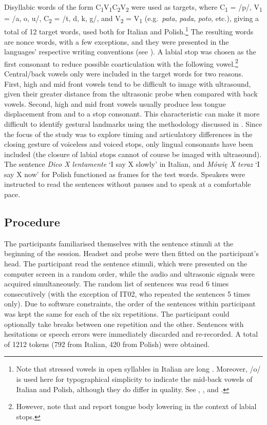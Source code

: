 \documentclass[preprint]{JASAnew}
\begin{document}
Disyllabic words of the form
C\textsubscript{1}V\textsubscript{1}C\textsubscript{2}V\textsubscript{2}
were used as targets, where C\textsubscript{1} = /p/, V\textsubscript{1}
= /a, o, u/, C\textsubscript{2} = /t, d, k, g/, and V\textsubscript{2} =
V\textsubscript{1} (e.g.~\emph{pata}, \emph{pada}, \emph{poto}, etc.),
giving a total of 12 target words, used both for Italian and
Polish.\footnote{Note that stressed vowels in open syllables in Italian are long \citep{renwick2016}. Moreover, /o/ is used here for typographical simplicity to indicate the mid-back vowels of Italian and Polish, although they do differ in quality. See \citet{kramer2009}, \citet{renwick2016}, and \citet{gussmann2007}.}
The resulting words are nonce words, with a few exceptions, and they
were presented in the languages' respective writing conventions (see
). A labial stop was chosen as the first consonant to
reduce possible coarticulation with the following
vowel.\footnote{However, note that \citet{westbury1983} and \citet{vazquez-alvarez2007} report tongue body lowering in the context of labial stops.}
Central/back vowels only were included in the target words for two
reasons. First, high and mid front vowels tend to be difficult to image
with ultrasound, given their greater distance from the ultrasonic probe
when compared with back vowels. Second, high and mid front vowels
usually produce less tongue displacement from and to a stop consonant.
This characteristic can make it more difficult to identify gestural
landmarks using the methodology discussed in . Since the
focus of the study was to explore timing and articulatory differences in
the closing gesture of voiceless and voiced stops, only lingual
consonants have been included (the closure of labial stops cannot of
course be imaged with ultrasound). The sentence \emph{Dico X lentamente}
`I say X slowly' in Italian, and \emph{Mówię X teraz} `I say X now' for
Polish functioned as frames for the test words. Speakers were instructed
to read the sentences without pauses and to speak at a comfortable pace.

\hypertarget{procedure}{%
\subsection{Procedure}\label{procedure}}

The participants familiarised themselves with the sentence stimuli at
the beginning of the session. Headset and probe were then fitted on the
participant's head. The participant read the sentence stimuli, which
were presented on the computer screen in a random order, while the audio
and ultrasonic signals were acquired simultaneously. The random list of
sentences was read 6 times consecutively (with the exception of IT02,
who repeated the sentences 5 times only). Due to software constraints,
the order of the sentences within participant was kept the same for each
of the six repetitions. The participant could optionally take breaks
between one repetition and the other. Sentences with hesitations or
speech errors were immediately discarded and re-recorded. A total of
1212 tokens (792 from Italian, 420 from Polish) were obtained.
\end{document}
